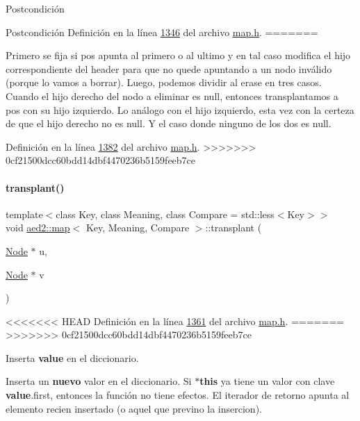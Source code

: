 \begin{DoxyPostcond}{\-Postcondición}
\begin{DoxyPostcond}{\-Postcondición}
\-Definición en la línea \hyperlink{map_8h_source_l01346}{1346} del archivo \hyperlink{map_8h_source}{map.\-h}.
=======

Primero se fija si pos apunta al primero o al ultimo y en tal caso modifica el hijo correspondiente del header para que no quede apuntando a un nodo inválido (porque lo vamos a borrar). Luego, podemos dividir al erase en tres casos. Cuando el hijo derecho del nodo a eliminar es null, entonces transplantamos a pos con su hijo izquierdo. Lo análogo con el hijo izquierdo, esta vez con la certeza de que el hijo derecho no es null. Y el caso donde ninguno de los dos es null. 

Definición en la línea \hyperlink{map_8h_source_l01382}{1382} del archivo \hyperlink{map_8h_source}{map.\+h}.
>>>>>>> 0cf21500dcc60bdd14dbf4470236b5159feeb7ce

\mbox{\label{classaed2_1_1map_a98b9f200c64ce02dfb67902ee00e375a_a98b9f200c64ce02dfb67902ee00e375a}} 
\paragraph{\texorpdfstring{transplant()}{transplant()}}
{\footnotesize\ttfamily template$<$class Key, class Meaning, class Compare = std\+::less$<$\+Key$>$$>$ \\
void \hyperlink{classaed2_1_1map}{aed2\+::map}$<$ Key, Meaning, Compare $>$\+::transplant (\begin{DoxyParamCaption}\item[{\hyperlink{structaed2_1_1map_1_1Node}{Node} $\ast$}]{u,  }\item[{\hyperlink{structaed2_1_1map_1_1Node}{Node} $\ast$}]{v }\end{DoxyParamCaption})\hspace{0.3cm}{\ttfamily [inline]}}

<<<<<<< HEAD
\-Definición en la línea \hyperlink{map_8h_source_l01361}{1361} del archivo \hyperlink{map_8h_source}{map.\-h}.
=======
>>>>>>> 0cf21500dcc60bdd14dbf4470236b5159feeb7ce


Inserta {\bfseries value} en el diccionario. 

Inserta un {\bfseries nuevo} valor en el diccionario. Si {\bfseries $\ast$this} ya tiene un valor con clave {\bfseries value}.first, entonces la función no tiene efectos. El iterador de retorno apunta al elemento recien insertado (o aquel que previno la insercion).



\end{DoxyPostcond}
\end{DoxyPostcond}
